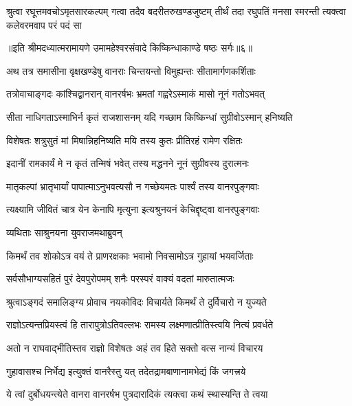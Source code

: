 \fourlineindentedshloka
{श्रुत्वा रघूत्तमवचोऽमृतसारकल्पम्}
{गत्वा तदैव बदरीतरुखण्डजुष्टम्}
{तीर्थं तदा रघुपतिं मनसा स्मरन्ती}
{त्यक्त्वा कलेवरमवाप परं पदं सा} %

{॥इति श्रीमदध्यात्मरामायणे उमामहेश्वरसंवादे किष्किन्धाकाण्डे
षष्ठः सर्गः॥६॥}





\twolineshloka
{अथ तत्र समासीना वृक्षखण्डेषु वानराः}
{चिन्तयन्तो विमुह्यन्तः सीतामार्गणकर्शिताः} %

\twolineshloka
{तत्रोवाचाङ्गदः कांश्चिद्वानरान् वानरर्षभः}
{भ्रमतां गह्वरेऽस्माकं मासो नूनं गतोऽभवत्} %

\twolineshloka
{सीता नाधिगताऽस्माभिर्न कृतं राजशासनम्}
{यदि गच्छाम किष्किन्धां सुग्रीवोऽस्मान् हनिष्यति} %

\twolineshloka
{विशेषतः शत्रुसुतं मां मिषान्निहनिष्यति}
{मयि तस्य कुतः प्रीतिरहं रामेण रक्षितः} %

\twolineshloka
{इदानीं रामकार्यं मे न कृतं तन्मिषं भवेत्}
{तस्य मद्धनने नूनं सुग्रीवस्य दुरात्मनः} %

\twolineshloka
{मातृकल्पां भ्रातृभार्यां पापात्माऽनुभवत्यसौ}
{न गच्छेयमतः पार्श्वं तस्य वानरपुङ्गवाः} %

\twolineshloka
{त्यक्ष्यामि जीवितं चात्र येन केनापि मृत्युना}
{इत्यश्रुनयनं केचिद्दृष्ट्वा वानरपुङ्गवाः} %

\onelineshloka
{व्यथिताः साश्रुनयना युवराजमथाब्रुवन्} %

\twolineshloka
{किमर्थं तव शोकोऽत्र वयं ते प्राणरक्षकाः}
{भवामो निवसामोऽत्र गुहायां भयवर्जिताः} %

\twolineshloka
{सर्वसौभाग्यसहितं पुरं देवपुरोपमम्}
{शनैः परस्परं वाक्यं वदतां मारुतात्मजः} %

\twolineshloka
{श्रुत्वाऽङ्गदं समालिङ्ग्य प्रोवाच नयकोविदः}
{विचार्यते किमर्थं ते दुर्विचारो न युज्यते} %

\twolineshloka
{राज्ञोऽत्यन्तप्रियस्त्वं हि तारापुत्रोऽतिवल्लभः}
{रामस्य लक्ष्मणात्प्रीतिस्त्वयि नित्यं प्रवर्धते} %

\twolineshloka
{अतो न राघवाद्भीतिस्तव राज्ञो विशेषतः}
{अहं तव हिते सक्तो वत्स नान्यं विचारय} %

\twolineshloka
{गुहावासश्च निर्भेद्य इत्युक्तं वानरैस्तु यत्}
{तदेतद्रामबाणानामभेद्यं किं जगत्त्रये} %

\twolineshloka
{ये त्वां दुर्बोधयन्त्येते वानरा वानरर्षभ}
{पुत्रदारादिकं त्यक्त्वा कथं स्थास्यन्ति ते त्वया} %

